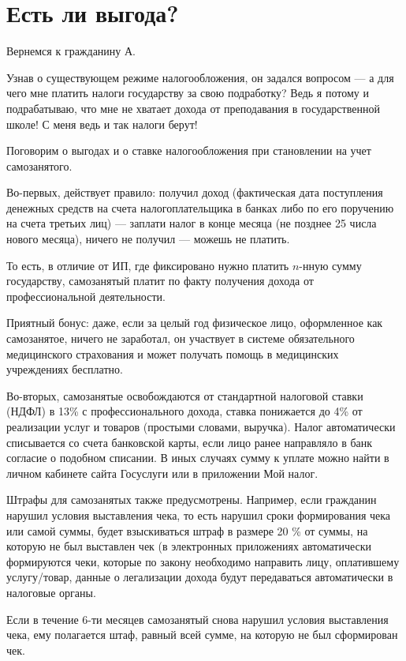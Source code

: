 \section{Есть ли выгода?}

Вернемся к гражданину А. 

Узнав о существующем режиме налогообложения, 
он задался вопросом --- 
а для чего мне платить налоги государству за свою подработку?
Ведь я потому и подрабатываю, 
что мне не хватает дохода от преподавания в государственной школе!
С меня ведь и так налоги берут!

Поговорим о выгодах и о ставке налогообложения при становлении на учет самозанятого.

Во-первых, действует правило: 
получил доход 
(фактическая дата поступления денежных средств 
на счета налогоплательщика в банках 
либо по его поручению на счета третьих лиц) --- 
заплати налог в конце месяца 
(не позднее 25 числа нового месяца), 
ничего не получил --- можешь не платить. 

То есть, в отличие от ИП, 
где фиксировано нужно платить $ n $-нную сумму государству, 
самозанятый платит по факту получения дохода от профессиональной деятельности. 

Приятный бонус: даже, если за целый год физическое лицо, 
оформленное как самозанятое, ничего не заработал, 
он участвует в системе обязательного медицинского страхования 
и может получать помощь в медицинских учреждениях бесплатно.

Во-вторых, самозанятые освобождаются от стандартной налоговой ставки (НДФЛ) в 13\% 
с профессионального дохода, 
ставка понижается до 4\% от реализации услуг и товаров (простыми словами, выручка). 
Налог автоматически списывается со счета банковской карты, 
если лицо ранее направляло в банк согласие о подобном списании. 
В иных случаях сумму к уплате можно найти в личном кабинете сайта 
Госуслуги или в приложении Мой налог. 

Штрафы для самозанятых также предусмотрены.
Например, если гражданин нарушил условия выставления чека, 
то есть нарушил сроки формирования чека или самой суммы, 
будет взыскиваться штраф в размере 20 \% от суммы, 
на которую не был выставлен чек 
(в электронных приложениях автоматически формируются чеки, 
которые по закону необходимо направить лицу, 
оплатившему услугу/товар, 
данные о легализации дохода будут передаваться автоматически в налоговые органы. 

Если в течение 6-ти месяцев самозанятый снова нарушил условия выставления чека,
ему полагается штаф, равный всей сумме, на которую не был сформирован чек.

